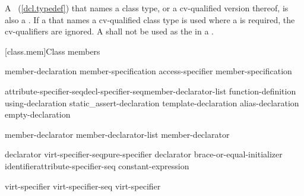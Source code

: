 \pnum
{}%
A ~(\ref{dcl.typedef}) that names a class type,
or a cv-qualified version thereof, is also a . If a
 that names a cv-qualified class type is used
where a  is required, the cv-qualifiers are
ignored. A  shall not be used as the
 in a .

[class.mem]{Class members}%
%

\begin{bnf}
\br
    member-declaration member-specification\opt\br
    access-specifier \terminal{:} member-specification\opt
\end{bnf}

\begin{bnf}
\br
    attribute-specifier-seq\opt decl-specifier-seq\opt member-declarator-list\opt \terminal{;}\br
    function-definition\br
    using-declaration\br
    static_assert-declaration\br
    template-declaration\br
    alias-declaration\br
    empty-declaration
\end{bnf}

\begin{bnf}
\br
    member-declarator\br
    member-declarator-list \terminal{,} member-declarator
\end{bnf}

\begin{bnf}
\br
    declarator virt-specifier-seq\opt pure-specifier\opt\br
    declarator brace-or-equal-initializer\opt\br
    identifier\opt attribute-specifier-seq\opt \terminal{:} constant-expression
\end{bnf}

\begin{bnf}
\br
    virt-specifier\br
    virt-specifier-seq virt-specifier
\end{bnf}

\begin{bnf}
\br
    \br
\end{bnf}

\begin{bnf}
\br
\end{bnf}

